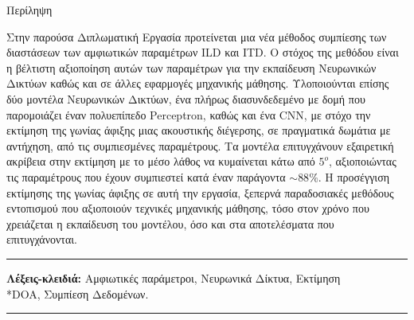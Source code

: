 \pagestyle{plain}
\begin{center}
{\LARGE Περίληψη}\\[1cm]
\end{center}

Στην παρούσα Διπλωματική Εργασία προτείνεται μια νέα μέθοδος συμπίεσης των διαστάσεων των αμφιωτικών παραμέτρων ILD και ITD. Ο στόχος της μεθόδου είναι η βέλτιστη αξιοποίηση αυτών των παραμέτρων για την εκπαίδευση Νευρωνικών Δικτύων καθώς και σε άλλες εφαρμογές μηχανικής μάθησης. Υλοποιούνται επίσης δύο μοντέλα Νευρωνικών Δικτύων, ένα πλήρως διασυνδεδεμένο με δομή που παρομοιάζει έναν πολυεπίπεδο Perceptron, καθώς και ένα CNN, με στόχο την εκτίμηση της γωνίας άφιξης μιας ακουστικής διέγερσης, σε πραγματικά δωμάτια με αντήχηση, από τις συμπιεσμένες παραμέτρους. Τα μοντέλα επιτυγχάνουν εξαιρετική ακρίβεια στην εκτίμηση με το μέσο λάθος να κυμαίνεται κάτω από $5^o$, αξιοποιώντας τις παραμέτρους που έχουν συμπιεστεί κατά έναν παράγοντα $\sim88\%$. Η προσέγγιση εκτίμησης της γωνίας άφιξης σε αυτή την εργασία, ξεπερνά παραδοσιακές μεθόδους εντοπισμού που αξιοποιούν τεχνικές μηχανικής μάθησης, τόσο στον χρόνο που χρειάζεται η εκπαίδευση του μοντέλου, όσο και στα αποτελέσματα που επιτυγχάνονται.

\begin{center}
    \rule{\textwidth}{1pt}
\end{center}{}
\textbf{Λέξεις-κλειδιά:} Αμφιωτικές παράμετροι, Νευρωνικά Δίκτυα, Εκτίμηση 
\\*DOA, Συμπίεση Δεδομένων.
\begin{center}
    \rule{\textwidth}{1pt}
\end{center}{}